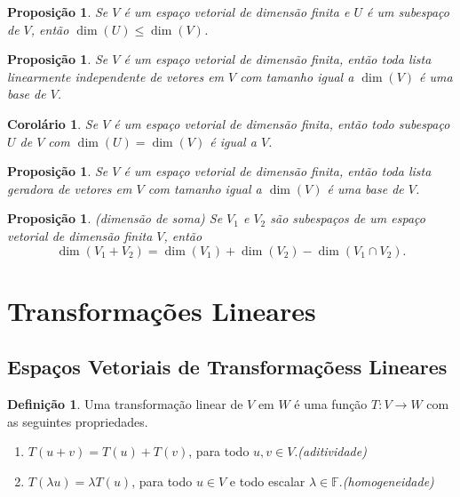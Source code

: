 \documentclass[12pt]{article}
\theoremstyle{plain}
\newtheorem{prop}[thm]{Proposição}
\newtheorem{cor}[thm]{Corolário}
\theoremstyle{definition}
\newtheorem{defn}[thm]{Definição}
\theoremstyle{remark}
\begin{document}
\begin{prop}
    Se \(V\) é um espaço vetorial de dimensão finita e \(U\) é um subespaço de \(V\), então \(\dim(U) \leq \dim(V)\).
\end{prop}

\begin{prop}
    Se \(V\) é um espaço vetorial de dimensão finita, então toda lista linearmente independente de vetores em \(V\) com tamanho igual a \(\dim(V)\) é uma base de \(V\).
\end{prop}

\begin{cor}
    Se \(V\) é um espaço vetorial de dimensão finita, então todo subespaço \(U\) de \(V\) com \(\dim(U) = \dim(V)\) é igual a \(V\).
\end{cor}

\begin{prop}
    Se \(V\) é um espaço vetorial de dimensão finita, então toda lista geradora de vetores em \(V\) com tamanho igual a \(\dim(V)\) é uma base de \(V\).
\end{prop}

\begin{prop} (dimensão de soma)
    Se \(V_1\) e \(V_2\) são subespaços de um espaço vetorial de dimensão finita \(V\), então
    \begin{equation}
        \dim(V_1 + V_2) = \dim(V_1) + \dim(V_2) - \dim(V_1 \cap V_2).
    \end{equation}
\end{prop}

\section{Transformações Lineares}

\subsection{Espaços Vetoriais de Transformaçõess Lineares}
\begin{defn}
    Uma transformação linear de \(V\) em \(W\) é uma função \(T: V \to W\) com as seguintes propriedades.
    \begin{enumerate}
        \item \(T(u + v) = T(u) + T(v)\), para todo \(u, v \in V\).\hfill\emph{(aditividade)}
        \item \(T(\lambda u) = \lambda T(u)\), para todo \(u \in V\) e todo escalar \(\lambda \in \mathbb{F}\).\hfill\emph{(homogeneidade)}
    \end{enumerate}
\end{defn}
\end{document}
